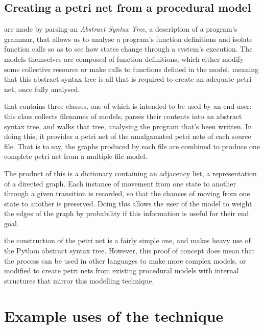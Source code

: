 \documentclass{tufte-handout}
\begin{document}
\subsection{Creating a petri net from a procedural model}
are made by parsing an \emph{Abstract Syntax Tree}, a description of a program's grammar, that allows us to analyse a program's function definitions and isolate function calls so as to see how states change through a system's execution. The models themselves are composed of function definitions, which either modify some collective resource or make calls to functions defined in the model, meaning that this abstract syntax tree is all that is required to create an adequate petri net, once fully analysed. \par
{}that contains three classes, one of which is intended to be used by an end user: this class collects filenames of models, parses their contents into an abstract syntax tree, and walks that tree, analysing the program that's been written. In doing this, it provides a petri net of the amalgamated petri nets of each source file. That is to say, the graphs produced by each file are combined to produce one complete petri net from a multiple file model. \par
The product of this is a dictionary containing an adjacency list, a representation of a directed graph. Each instance of movement from one state to another through a given transition is recorded, so that the chances of moving from one state to another is preserved. Doing this allows the user of the model to weight the edges of the graph by probability if this information is useful for their end goal. \par

the construction of the petri net is a fairly simple one, and makes heavy use of the Python abstract syntax tree. However, this proof of concept does mean that the process can be used in other languages to make more complex models, or modified to create petri nets from existing procedural models with internal structures that mirror this modelling technique. 


\newpage
\section{Example uses of the technique}
\end{document}
